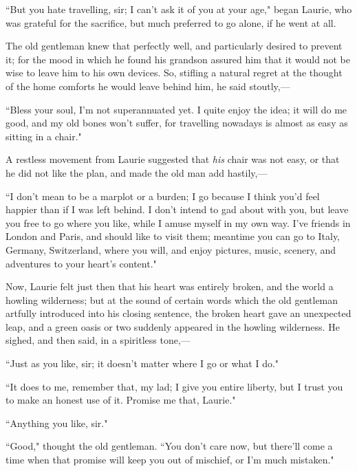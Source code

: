 ``But you hate travelling, sir; I can't ask it of you at
your age," began Laurie, who was grateful for the sacrifice, but much
preferred to go alone, if he went at all.

The old gentleman knew that perfectly well, and particularly desired to
prevent it; for the mood in which he found his grandson assured him that
it would not be wise to leave him to his own devices. So, stifling a
natural regret at the thought of the home comforts he would leave behind
him, he said stoutly,---

``Bless your soul, I'm not superannuated yet. I quite
enjoy the idea; it will do me good, and my old bones
won't suffer, for travelling nowadays is almost as easy
as sitting in a chair."

A restless movement from Laurie suggested that \emph{his} chair was not
easy, or that he did not like the plan, and made the old man add
hastily,---

``I don't mean to be a marplot or a burden; I go because
I think you'd feel happier than if I was left behind. I
don't intend to gad about with you, but leave you free
to go where you like, while I amuse myself in my own way.
I've friends in London and Paris, and should like to
visit them; meantime you can go to Italy, Germany, Switzerland, where
you will, and enjoy pictures, music, scenery, and adventures to your
heart's content."

Now, Laurie felt just then that his heart was entirely broken, and the
world a howling wilderness; but at the sound of certain words which the
old gentleman artfully introduced into his closing sentence, the broken
heart gave an unexpected leap, and a green oasis or two suddenly
appeared in the howling wilderness. He sighed, and then said, in a
spiritless tone,---

``Just as you like, sir; it doesn't matter where I go or
what I do."

``It does to me, remember that, my lad; I give you entire liberty, but I
trust you to make an honest use of it. Promise me that, Laurie."

``Anything you like, sir."

``Good," thought the old gentleman. ``You don't care now,
but there'll come a time when that promise will keep you
out of mischief, or I'm much mistaken."

